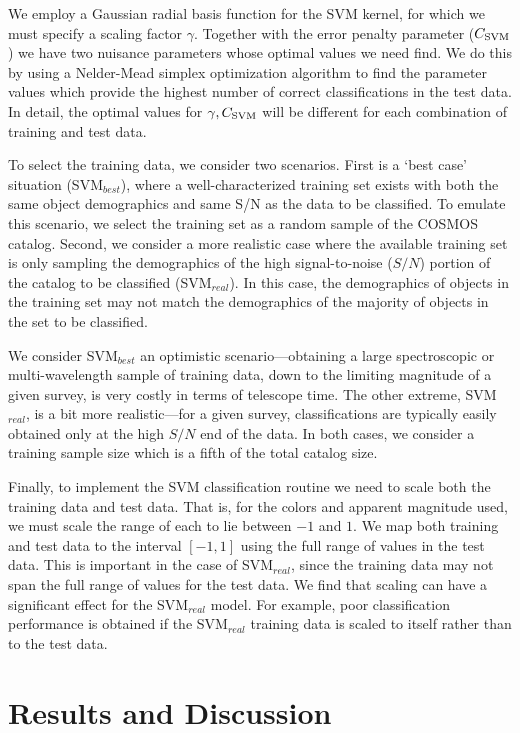 \documentclass[12pt,preprint]{aastex}
\begin{document}
We employ a Gaussian radial basis function for the SVM kernel, 
for which we must specify a scaling factor $\gamma$.  Together with 
the error penalty parameter ($C_{\rm SVM}$) we have two 
nuisance parameters whose optimal values we need 
find.  We do this by using a Nelder-Mead simplex optimization algorithm to find the 
parameter values which provide the highest number of correct 
classifications in the test data.  In detail, the optimal values for 
$\gamma,C_{\rm SVM}$ will be different for each combination of 
training and test data.

To select the training data, we consider two scenarios.  First is a
`best case' situation (SVM$_{best}$), where a well-characterized
training set exists with both the same object demographics and same
S/N as the data to be classified.  To emulate this scenario, we select
the training set as a random sample of the COSMOS catalog.  Second, we
consider a more realistic case where the available training set is
only sampling the demographics of the high signal-to-noise ($S/N$)
portion of the catalog to be classified (SVM$_{real}$).  In this
case, the demographics of objects in the training set may not match
the demographics of the majority of objects in the set to be
classified.

We consider SVM$_{best}$ an optimistic scenario---obtaining a large
spectroscopic or multi-wavelength sample of training data, down to the
limiting magnitude of a given survey, is very costly in terms of
telescope time.  The other extreme, SVM$_{real}$, is a bit more
realistic---for a given survey, classifications are typically easily
obtained only at the high $S/N$ end of the data.  In both cases, we
consider a training sample size which is a fifth of the total catalog
size.

Finally, to implement the SVM classification routine we need to scale
both the training data and test data.  That is, for the colors and apparent magnitude used, we must
scale the range of each to lie between $-1$ and $1$.  We map both
training and test data to the interval $[-1,1]$ using the full range
of values in the test data.  This is important in the case of
SVM$_{real}$, since the training data may not span the full range of
values for the test data.  We find that scaling can have a significant
effect for the SVM$_{real}$ model.  For example, poor classification
performance is obtained if the SVM$_{real}$ training data is scaled to
itself rather than to the test data.


\section{Results and Discussion}
\label{sec:results}
\end{document}
